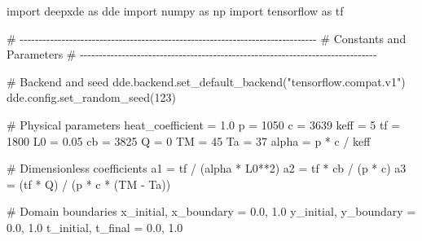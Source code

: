 \documentclass[
  spanish,
  us-letterpaper,
  DIV=11,
  numbers=noendperiod]{scrreprt}
\newenvironment{Shaded}{\begin{snugshade}}{\end{snugshade}}
\newcommand{\CommentTok}[1]{\textcolor[rgb]{0.37,0.37,0.37}{#1}}
\newcommand{\DecValTok}[1]{\textcolor[rgb]{0.68,0.00,0.00}{#1}}
\newcommand{\FloatTok}[1]{\textcolor[rgb]{0.68,0.00,0.00}{#1}}
\newcommand{\ImportTok}[1]{\textcolor[rgb]{0.00,0.46,0.62}{#1}}
\newcommand{\NormalTok}[1]{\textcolor[rgb]{0.00,0.23,0.31}{#1}}
\newcommand{\OperatorTok}[1]{\textcolor[rgb]{0.37,0.37,0.37}{#1}}
\newcommand{\StringTok}[1]{\textcolor[rgb]{0.13,0.47,0.30}{#1}}
\begin{document}
\begin{Shaded}
\begin{Highlighting}[]
\ImportTok{import}\NormalTok{ deepxde }\ImportTok{as}\NormalTok{ dde}
\ImportTok{import}\NormalTok{ numpy }\ImportTok{as}\NormalTok{ np}
\ImportTok{import}\NormalTok{ tensorflow }\ImportTok{as}\NormalTok{ tf}

\CommentTok{\# {-}{-}{-}{-}{-}{-}{-}{-}{-}{-}{-}{-}{-}{-}{-}{-}{-}{-}{-}{-}{-}{-}{-}{-}{-}{-}{-}{-}{-}{-}{-}{-}{-}{-}{-}{-}{-}{-}{-}{-}{-}{-}{-}{-}{-}{-}{-}{-}{-}{-}{-}{-}{-}{-}{-}{-}{-}{-}{-}{-}{-}{-}{-}{-}{-}{-}{-}{-}{-}{-}{-}{-}{-}{-}{-}{-}{-}{-}}
\CommentTok{\# Constants and Parameters}
\CommentTok{\# {-}{-}{-}{-}{-}{-}{-}{-}{-}{-}{-}{-}{-}{-}{-}{-}{-}{-}{-}{-}{-}{-}{-}{-}{-}{-}{-}{-}{-}{-}{-}{-}{-}{-}{-}{-}{-}{-}{-}{-}{-}{-}{-}{-}{-}{-}{-}{-}{-}{-}{-}{-}{-}{-}{-}{-}{-}{-}{-}{-}{-}{-}{-}{-}{-}{-}{-}{-}{-}{-}{-}{-}{-}{-}{-}{-}{-}{-}}

\CommentTok{\# Backend and seed}
\NormalTok{dde.backend.set\_default\_backend(}\StringTok{"tensorflow.compat.v1"}\NormalTok{)}
\NormalTok{dde.config.set\_random\_seed(}\DecValTok{123}\NormalTok{)}

\CommentTok{\# Physical parameters}
\NormalTok{heat\_coefficient }\OperatorTok{=} \FloatTok{1.0}
\NormalTok{p }\OperatorTok{=} \DecValTok{1050}
\NormalTok{c }\OperatorTok{=} \DecValTok{3639}
\NormalTok{keff }\OperatorTok{=} \DecValTok{5}
\NormalTok{tf }\OperatorTok{=} \DecValTok{1800}
\NormalTok{L0 }\OperatorTok{=} \FloatTok{0.05}
\NormalTok{cb }\OperatorTok{=} \DecValTok{3825}
\NormalTok{Q }\OperatorTok{=} \DecValTok{0}
\NormalTok{TM }\OperatorTok{=} \DecValTok{45}
\NormalTok{Ta }\OperatorTok{=} \DecValTok{37}
\NormalTok{alpha }\OperatorTok{=}\NormalTok{ p }\OperatorTok{*}\NormalTok{ c }\OperatorTok{/}\NormalTok{ keff}

\CommentTok{\# Dimensionless coefficients}
\NormalTok{a1 }\OperatorTok{=}\NormalTok{ tf }\OperatorTok{/}\NormalTok{ (alpha }\OperatorTok{*}\NormalTok{ L0}\OperatorTok{**}\DecValTok{2}\NormalTok{)}
\NormalTok{a2 }\OperatorTok{=}\NormalTok{ tf }\OperatorTok{*}\NormalTok{ cb }\OperatorTok{/}\NormalTok{ (p }\OperatorTok{*}\NormalTok{ c)}
\NormalTok{a3 }\OperatorTok{=}\NormalTok{ (tf }\OperatorTok{*}\NormalTok{ Q) }\OperatorTok{/}\NormalTok{ (p }\OperatorTok{*}\NormalTok{ c }\OperatorTok{*}\NormalTok{ (TM }\OperatorTok{{-}}\NormalTok{ Ta))}

\CommentTok{\# Domain boundaries}
\NormalTok{x\_initial, x\_boundary }\OperatorTok{=} \FloatTok{0.0}\NormalTok{, }\FloatTok{1.0}
\NormalTok{y\_initial, y\_boundary }\OperatorTok{=} \FloatTok{0.0}\NormalTok{, }\FloatTok{1.0}
\NormalTok{t\_initial, t\_final }\OperatorTok{=} \FloatTok{0.0}\NormalTok{, }\FloatTok{1.0}


\end{Highlighting}
\end{Shaded}
\end{document}
